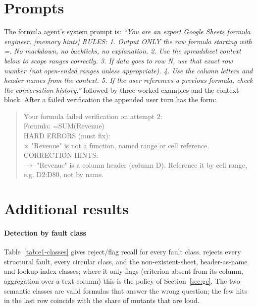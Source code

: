 \section{Prompts}
\label{app:prompts}
The formula agent's system prompt is: \emph{``You are an expert Google Sheets formula engineer. [memory hints] RULES: 1. Output ONLY the raw formula starting with =. No markdown, no backticks, no explanation. 2. Use the spreadsheet context below to scope ranges correctly. 3. If data goes to row N, use that exact row number (not open-ended ranges unless appropriate). 4. Use the column letters and header names from the context. 5. If the user references a previous formula, check the conversation history.''} followed by three worked examples and the context block. After a failed verification the appended user turn has the form:
\begin{quote}\small\ttfamily
Your formula failed verification on attempt 2:\\
Formula: =SUM(Revenue)\\
HARD ERRORS (must fix):\\
\hspace*{1em}$\times$ "Revenue" is not a function, named range or cell reference.\\
CORRECTION HINTS:\\
\hspace*{1em}$\rightarrow$ "Revenue" is a column header (column D). Reference it by cell range, e.g. D2:D80, not by name.
\end{quote}

\section{Additional results}
\label{app:results}

\paragraph{Detection by fault class}
Table~\ref{tab:e1-classes} gives reject/flag recall for every fault class. \gc{} rejects every structural fault, every circular class, and the non-existent-sheet, header-as-name and lookup-index classes; where it only flags (criterion absent from its column, aggregation over a text column) this is the policy of Section~\ref{sec:gc}. The two semantic classes are valid formulas that answer the wrong question; the few hits in the last row coincide with the share of mutants that are loud.



